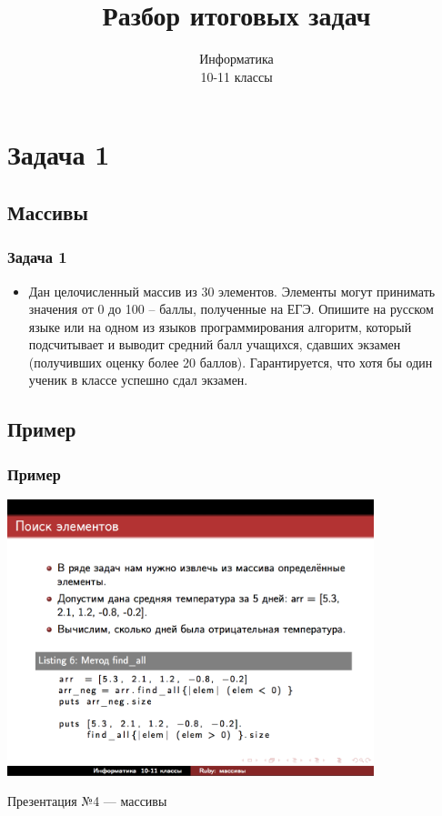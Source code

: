 \documentclass[compress,red]{beamer}
\title{Разбор итоговых задач}
\author{Информатика \\ 10-11 классы}
\begin{document}
\maketitle

\section{Задача 1}

\subsection{Массивы}
\begin{frame}[fragile]
  \frametitle{Задача 1}
  \begin{itemize}
    \item Дан целочисленный массив из 30 элементов. Элементы могут принимать значения от 0 до 100 – баллы, полученные на ЕГЭ. Опишите на русском языке или на одном из языков программирования алгоритм, который подсчитывает и выводит средний балл учащихся, сдавших экзамен (получивших оценку более 20 баллов). Гарантируется, что хотя бы один ученик в классе успешно сдал экзамен.
  \end{itemize}
\end{frame}

\subsection{Пример}
\begin{frame}[fragile]
  \frametitle{Пример}
  \centerline{\includegraphics[width=0.8\textwidth]{images/screen1.png}}
  \centerline{Презентация №4 --- массивы}
\end{frame}
\end{document}
